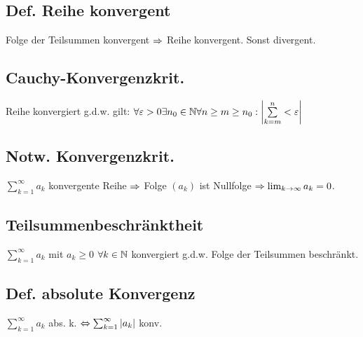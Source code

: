\subsection*{Def. Reihe konvergent}
Folge der Teilsummen konvergent $\Rightarrow$ Reihe konvergent. Sonst divergent.
\subsection*{Cauchy-Konvergenzkrit.}
Reihe konvergiert g.d.w. gilt: $\forall \varepsilon > 0 \exists n_0\in \mathbb N \forall n \geq m \geq n_0: \left|\sum\limits_{k = m}^{n} < \varepsilon \right|$ 
\subsection*{Notw. Konvergenzkrit.}
$\sum_{k=1}^\infty a_k$ konvergente Reihe $\Rightarrow$ Folge $(a_k)$ ist Nullfolge $\Rightarrow \lim_{k\rightarrow \infty} a_k = 0$.
\subsection*{Teilsummenbeschränktheit}
$\sum_{k=1}^\infty a_k$ mit $a_k \geq 0$ $\forall k \in \mathbb N$ konvergiert g.d.w. Folge der Teilsummen beschränkt.
\subsection*{Def. absolute Konvergenz}
$\sum_{k = 1}^\infty a_k$ abs. k. $\Leftrightarrow \sum_{k = 1}^\infty |a_k|$ konv.
